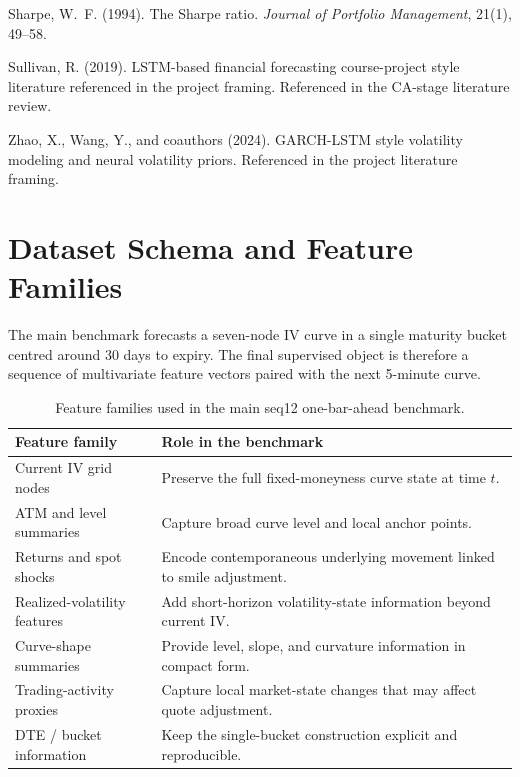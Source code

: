 \documentclass[12pt]{report}
\begin{document}
\begin{thebibliography}{99}
Sharpe, W.~F. (1994).
\newblock The Sharpe ratio.
\newblock \emph{Journal of Portfolio Management}, 21(1), 49--58.

Sullivan, R. (2019).
\newblock LSTM-based financial forecasting course-project style literature referenced in the project framing.
\newblock Referenced in the CA-stage literature review.

Zhao, X., Wang, Y., and coauthors (2024).
\newblock GARCH-LSTM style volatility modeling and neural volatility priors.
\newblock Referenced in the project literature framing.

\end{thebibliography}

\appendix

\chapter{Dataset Schema and Feature Families}
The main benchmark forecasts a seven-node IV curve in a single maturity bucket centred around 30 days to expiry. The final supervised object is therefore a sequence of multivariate feature vectors paired with the next 5-minute curve.

\begin{table}[H]
\centering
\caption{Feature families used in the main seq12 one-bar-ahead benchmark.}
\footnotesize
\renewcommand{\arraystretch}{1.15}
\begin{tabularx}{\textwidth}{@{}lY@{}}
\toprule
\textbf{Feature family} & \textbf{Role in the benchmark} \\
\midrule
Current IV grid nodes & Preserve the full fixed-moneyness curve state at time \(t\). \\
ATM and level summaries & Capture broad curve level and local anchor points. \\
Returns and spot shocks & Encode contemporaneous underlying movement linked to smile adjustment. \\
Realized-volatility features & Add short-horizon volatility-state information beyond current IV. \\
Curve-shape summaries & Provide level, slope, and curvature information in compact form. \\
Trading-activity proxies & Capture local market-state changes that may affect quote adjustment. \\
DTE / bucket information & Keep the single-bucket construction explicit and reproducible. \\
\bottomrule
\end{tabularx}
\end{table}
\end{document}
